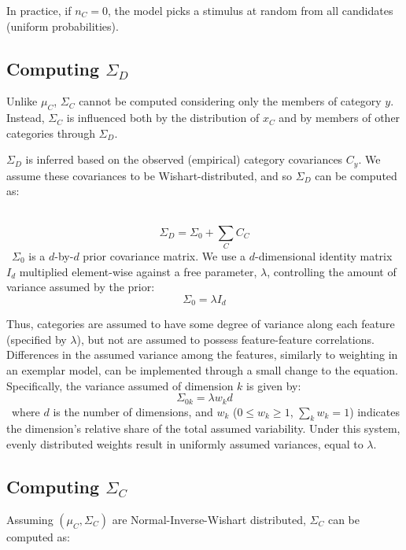 \documentclass[12pt]{article}
\begin{document}
In practice, if $n_C = 0$, the model picks a stimulus at random from all candidates (uniform probabilities). 

\subsection*{Computing $\Sigma_D$}

Unlike $\mu_C$, $\Sigma_C$ cannot be computed considering only the members of category $y$. Instead, $\Sigma_C$ is influenced both by the distribution of $x_C$ and by members of other categories through $\Sigma_D$.

$\Sigma_D$ is inferred based on the observed (empirical) category covariances $C_y$. We assume these covariances to be Wishart-distributed, and so $\Sigma_D$ can be computed as:

\
\begin{equation}
    \Sigma_D = \Sigma_0 + \sum_{C}{C_C}
\end{equation}
\
$\Sigma_{0}$ is a $d$-by-$d$ prior covariance matrix. We use a $d$-dimensional identity matrix $I_d$ multiplied element-wise against a free parameter, $\lambda$, controlling the amount of variance assumed by the prior:
\
\begin{equation}
    \Sigma_0 =  \lambda I_d
\end{equation}

Thus, categories are assumed to have some degree of variance along each feature (specified by $\lambda$), but not are assumed to possess feature-feature correlations. Differences in the assumed variance among the features, similarly to weighting in an exemplar model, can be implemented through a small change to the equation. Specifically, the variance assumed of dimension $k$ is given by:
\
\begin{equation}
    \Sigma_{0k} =  \lambda w_k d
\end{equation}
\
where $d$ is the number of dimensions, and $w_k$ ($0 \leq w_k \geq 1$, $\sum_k{w_k} = 1$) indicates the dimension's relative share of the total assumed variability. Under this system, evenly distributed weights result in uniformly assumed variances, equal to $\lambda$.

\subsection*{Computing $\Sigma_C$}

Assuming $(\mu_C, \Sigma_C)$ are Normal-Inverse-Wishart distributed, $\Sigma_C$ can be computed as:
\end{document}
